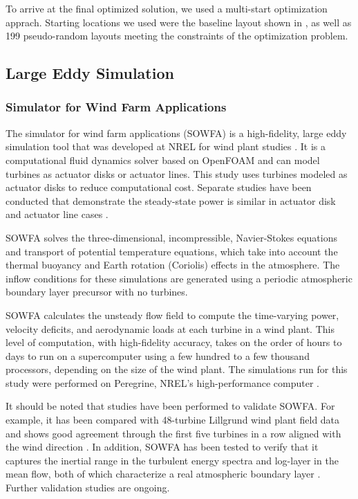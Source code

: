 \documentclass[conf]{new-aiaa}
\begin{document}
To arrive at the final optimized solution, we used a multi-start optimization apprach. Starting locations we used were the baseline layout shown in , as well as 199 pseudo-random layouts meeting the constraints of the optimization problem.
\subsection{Large Eddy Simulation}

\subsubsection{Simulator for Wind Farm Applications}

The simulator for wind farm applications (SOWFA) is a high-fidelity, large eddy simulation tool that was developed at NREL for wind plant studies \cite{churchfieldnwtc,churchfield2012numerical,fleming2013sowfa}.  It is a computational fluid dynamics solver based on OpenFOAM \cite{jasak2007openfoam} and can model turbines as actuator disks or actuator lines.  This study uses turbines modeled as actuator disks to reduce computational cost.  Separate studies have been conducted that demonstrate the steady-state power is similar in actuator disk and actuator line cases \cite{martinez2012comparison}.

SOWFA solves the three-dimensional, incompressible, Navier-Stokes equations and transport of potential temperature equations, which take into account the thermal buoyancy and Earth rotation (Coriolis) effects in the atmosphere.  The inflow conditions for these simulations are generated using a periodic atmospheric boundary layer precursor with no turbines.  

SOWFA calculates the unsteady flow field to compute the time-varying power, velocity deficits, and aerodynamic loads at each turbine in a wind plant.  This level of computation, with high-fidelity accuracy, takes on the order of hours to days to run on a supercomputer using a few hundred to a few thousand processors, depending on the size of the wind plant.  The simulations run for this study were performed on Peregrine, NREL's high-performance computer \cite{regimbal2015peregrine}.

It should be noted that studies have been performed to validate SOWFA.  For example, it has been compared with 48-turbine Lillgrund wind plant field data and shows good agreement through the first five turbines in a row aligned with the wind direction \cite{churchfield2012large}.  In addition, SOWFA has been tested to verify that it captures the inertial range in the turbulent energy spectra and log-layer in the mean flow, both of which characterize a real atmospheric boundary layer \cite{churchfield2012numerical}.  Further validation studies are ongoing.  
\end{document}
